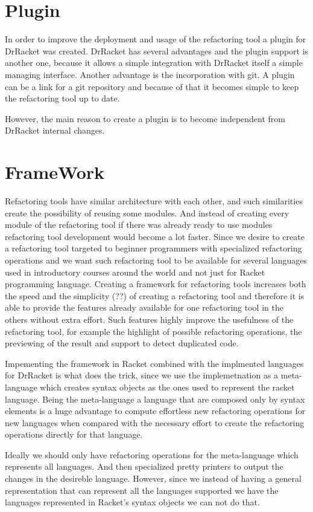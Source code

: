 
\section{Plugin}
In order to improve the deployment and usage of the refactoring tool a plugin
for DrRacket was created.
DrRacket has several advantages and the plugin support is another one, because
it allows a simple integration with DrRacket itself a simple managing interface.
Another advantage is the incorporation with git. A plugin can be a link for a git
repository and because of that it becomes simple to keep the refactoring tool up to date.

However, the main reason to create a plugin is to become independent from DrRacket
internal changes.
\section{FrameWork}
Refactoring tools have similar architecture with each other, and such similarities
create the possibility of reusing some modules. And instead of creating every
module of the refactoring tool if there was already ready to use modules refactoring
tool development would become a lot faster.
Since we desire to create a refactoring tool targeted to beginner programmers with
specialized refactoring operations and we want such refactoring tool to be available
for several languages used in introductory courses around the world and not just for
Racket programming language.
Creating a framework for refactoring tools increases both the speed and the simplicity (??)
of creating a refactoring tool and therefore it is able to provide the features already available
for one refactoring tool in the others without extra effort. Such features highly improve
the usefulness of the refactoring tool, for example the highlight of possible refactoring
operations, the previewing of the result and support to detect duplicated code.


 Impementing the framework in Racket combined with the implmented languages for DrRacket is what does the trick,
 since we use the implemetnation as a meta-language which creates syntax objects as the ones used to represent the racket language.
  Being the meta-language a language that are
 composed only by syntax elements is a huge advantage to compute effortless new
 refactoring operations for new languages when compared with the necessary effort to create
 the refactoring operations directly for that language.

Ideally we should only have refactoring operations for the meta-language which represents
all languages. And then specialized pretty printers to output the changes in the
desireble language.
However, since we instead of having a general representation that can represent all the languages
supported we have the languages represented in Racket's syntax objects we can not do that.

